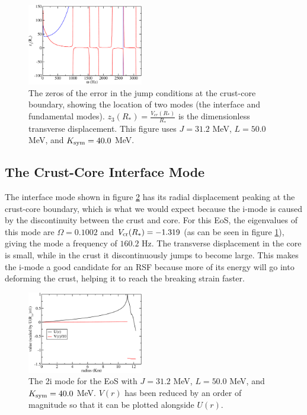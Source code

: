 \documentclass[fleqn,usenatbib]{mnras}
\begin{document}
\begin{figure}
\centering
\includegraphics[width=0.45\textwidth,angle=0]{minima_31.2_50.0_40.0_f.pdf}
\caption{The zeros of the error in the jump conditions at the crust-core boundary, showing the location of two modes (the interface and fundamental modes). $z_3(R_*)=\frac{V_{cr}(R_*)}{R_*}$ is the dimensionless transverse displacement. This figure uses $J=31.2$ MeV, $L=50.0$ MeV, and $K_{\rm sym}=40.0$ MeV.}
\label{fig:trace_minima}  %
\end{figure}







\subsection{The Crust-Core Interface Mode}
\hspace{\parindent}The interface mode shown in figure \ref{fig:2i_mode} has its radial displacement peaking at the crust-core boundary, which is what we would expect because the i-mode is caused by the discontinuity between the crust and core. For this EoS, the eigenvalues of this mode are $\Omega=0.1002$ and $V_{\rm cr}(R_*)=-1.319$ (as can be seen in figure \ref{fig:trace_minima}), giving the mode a frequency of $160.2$ Hz. The transverse displacement in the core is small, while in the crust it discontinuously jumps to become large. This makes the i-mode a good candidate for an RSF because more of its energy will go into deforming the crust, helping it to reach the breaking strain faster.

\begin{figure}
\centering
\includegraphics[width=0.45\textwidth,angle=0]{2i_mode.pdf}
\caption{The 2i mode for the EoS with $J=31.2$ MeV, $L=50.0$ MeV, and $K_{\rm sym}=40.0$ MeV. $V(r)$ has been reduced by an order of magnitude so that it can be plotted alongside $U(r)$.}
\label{fig:2i_mode}
\end{figure}
\end{document}
